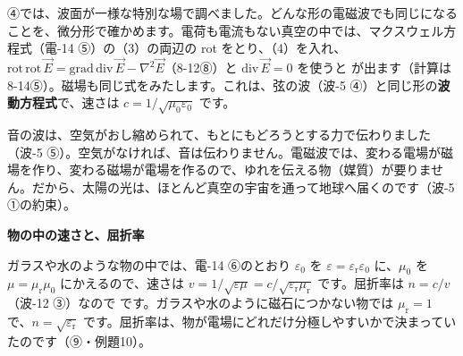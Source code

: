 \phkokomade



\leavevmode\label{ph:電-15:sec6}④では、波面が一様な特別な場で調べました。どんな形の電磁波でも同じになることを、微分形で確かめます。電荷も電流もない真空の中では、マクスウェル方程式（電-14 ⑤）の（3）の両辺の rot をとり、（4）を入れ、$\mathrm{rot}\,\mathrm{rot}\,\vec E=\mathrm{grad}\,\mathrm{div}\,\vec E-\nabla^2\vec E$（8-12⑧）と $\mathrm{div}\,\vec E=0$ を使うと
\label{ph:電-15:hadou}が出ます（計算は 8-14⑤）。磁場も同じ式をみたします。これは、弦の波（波-5 ④）と同じ形の\textbf{波動方程式}で、速さは $c=1/\sqrt{\mu_0\varepsilon_0}$ です。

\begin{phflow}[マクスウェル方程式から光へ]
\end{phflow}

音の波は、空気がおし縮められて、もとにもどろうとする力で伝わりました（波-5 ⑤）。空気がなければ、音は伝わりません。電磁波では、変わる電場が磁場を作り、変わる磁場が電場を作るので、ゆれを伝える物（媒質）が要りません。だから、太陽の光は、ほとんど真空の宇宙を通って地球へ届くのです（波-5 ①の約束）。

\noindent\textbf{物の中の速さと、屈折率}\par\nobreak
ガラスや水のような物の中では、電-14 ⑥のとおり $\varepsilon_0$ を $\varepsilon=\varepsilon_{\mathrm r}\varepsilon_0$ に、$\mu_0$ を $\mu=\mu_{\mathrm r}\mu_0$ にかえるので、速さは $v=1/\sqrt{\varepsilon\mu}=c/\sqrt{\varepsilon_{\mathrm r}\mu_{\mathrm r}}$ です。屈折率は $n=c/v$（波-12 ③）なので
\label{ph:電-15:n}です。ガラスや水のように磁石につかない物では $\mu_{\mathrm r}=1$ で、$n=\sqrt{\varepsilon_{\mathrm r}}$ です。屈折率は、物が電場にどれだけ分極しやすいかで決まっていたのです（⑨・例題10）。

